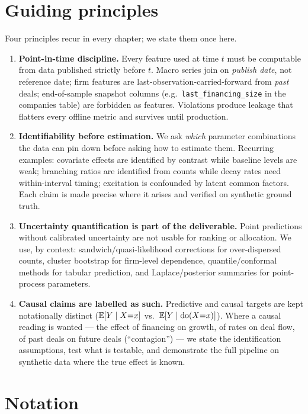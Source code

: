 \section{Guiding principles}

Four principles recur in every chapter; we state them once here.

\begin{enumerate}
\item \textbf{Point-in-time discipline.} Every feature used at time $t$ must be computable
from data published strictly before $t$. Macro series join on \emph{publish date}, not
reference date; firm features are last-observation-carried-forward from \emph{past} deals;
end-of-sample snapshot columns (e.g.\ \texttt{last\_financing\_size} in the companies
table) are forbidden as features. Violations produce leakage that flatters every offline
metric and survives until production.
\item \textbf{Identifiability before estimation.} We ask \emph{which} parameter
combinations the data can pin down before asking how to estimate them. Recurring examples:
covariate effects are identified by contrast while baseline levels are weak; branching
ratios are identified from counts while decay rates need within-interval timing;
excitation is confounded by latent common factors. Each claim is made precise where it
arises and verified on synthetic ground truth.
\item \textbf{Uncertainty quantification is part of the deliverable.} Point predictions
without calibrated uncertainty are not usable for ranking or allocation. We use, by
context: sandwich/quasi-likelihood corrections for over-dispersed counts, cluster
bootstrap for firm-level dependence, quantile/conformal methods for tabular prediction,
and Laplace/posterior summaries for point-process parameters.
\item \textbf{Causal claims are labelled as such.} Predictive and causal targets are kept
notationally distinct ($\mathbb{E}[Y \mid X{=}x]$ vs.\ $\mathbb{E}[Y \mid \mathrm{do}(X{=}x)]$). Where a causal
reading is wanted --- the effect of financing on growth, of rates on deal flow, of past
deals on future deals (``contagion'') --- we state the identification assumptions, test
what is testable, and demonstrate the full pipeline on synthetic data where the true
effect is known.
\end{enumerate}

\section{Notation}
\label{sec:notation}

